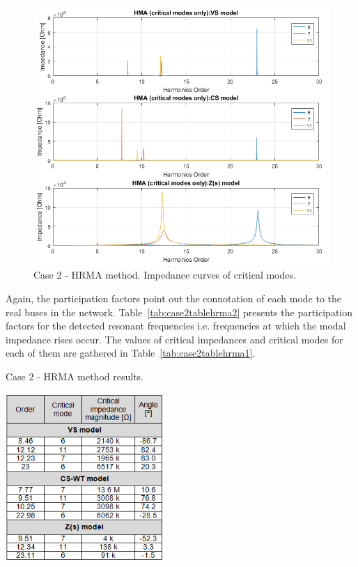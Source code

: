 \documentclass[12pt]{report} %
\begin{document}
\begin{figure}[htb]
	\centering
	\includegraphics[width=1\textwidth]{img/Case2/Case2_HMA_crit.png}
  	\caption{Case 2 - HRMA method. Impedance curves of critical modes.}
  	\label{fig:case2hrma3}
\end{figure}
\FloatBarrier

Again, the participation factors point out the connotation of each mode to the real buses in the network. Table~\ref{tab:case2tablehrma2} presents the participation factors for the detected resonant frequencies i.e. frequencies at which the modal impedance rises occur. The values of critical impedances and critical modes for each of them are gathered in Table~\ref{tab:case2tablehrma1}.

\begin{table}[htb]
	\centering
	\caption{Case 2 - HRMA method results.}
	\label{tab:case2tablehrma1}
	\includegraphics[width=0.45\textwidth]{img/Case2/table_HRMA1.png}
\end{table}
\FloatBarrier
\end{document}
